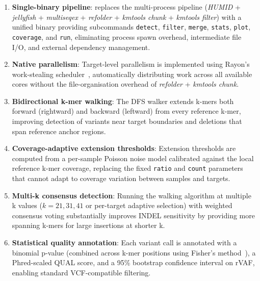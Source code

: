 \begin{enumerate}

  \item \textbf{Single-binary pipeline}: \kmerdet{} replaces the
    multi-process \kam{} pipeline (\textit{HUMID} + \textit{jellyfish} +
    \textit{multiseqex} + \textit{refolder} + \textit{kmtools chunk} +
    \textit{kmtools filter}) with a unified binary providing subcommands
    \texttt{detect}, \texttt{filter}, \texttt{merge}, \texttt{stats},
    \texttt{plot}, \texttt{coverage}, and \texttt{run}, eliminating process
    spawn overhead, intermediate file I/O, and external dependency management.

  \item \textbf{Native parallelism}: Target-level parallelism is implemented
    using Rayon's work-stealing scheduler~\cite{rayon}, automatically
    distributing work across all available cores without the file-organisation
    overhead of \textit{refolder} + \textit{kmtools chunk}.

  \item \textbf{Bidirectional k-mer walking}: The DFS walker extends k-mers
    both forward (rightward) and backward (leftward) from every reference
    k-mer, improving detection of variants near target boundaries and deletions
    that span reference anchor regions.

  \item \textbf{Coverage-adaptive extension thresholds}: Extension thresholds
    are computed from a per-sample Poisson noise model calibrated against the
    local reference k-mer coverage, replacing the fixed \texttt{ratio} and
    \texttt{count} parameters that cannot adapt to coverage variation between
    samples and targets.

  \item \textbf{Multi-k consensus detection}: Running the walking algorithm at
    multiple k values ($k = 21, 31, 41$ or per-target adaptive selection)
    with weighted consensus voting substantially improves INDEL sensitivity by
    providing more spanning k-mers for large insertions at shorter k.

  \item \textbf{Statistical quality annotation}: Each variant call is
    annotated with a binomial p-value (combined across k-mer positions using
    Fisher's method~\cite{fisher1925statistical}), a Phred-scaled QUAL score,
    and a 95\% bootstrap confidence interval on rVAF, enabling standard
    VCF-compatible filtering.


\end{enumerate}
